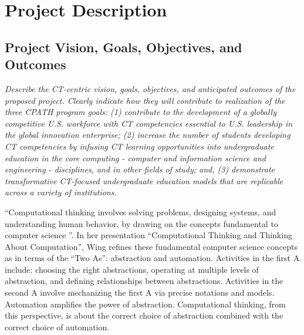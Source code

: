 
\section*{Project Description}
\renewcommand{\thepage} {C--\arabic{page}}

\subsection*{Project Vision, Goals, Objectives, and Outcomes}


{\em Describe the CT-centric vision, goals, objectives, and anticipated outcomes of the proposed project. Clearly indicate how they will contribute to realization of the three CPATH program goals: (1) contribute to the development of a globally competitive U.S. workforce with CT competencies essential to U.S. leadership in the global innovation enterprise; (2) increase the number of students developing CT competencies by infusing CT learning opportunities into undergraduate education in the core computing - computer and information science and engineering - disciplines, and in other fields of study; and, (3) demonstrate transformative CT-focused undergraduate education models that are replicable across a variety of institutions.
}

\bigskip

``Computational thinking involves solving problems, designing systems, and
understanding human behavior, by drawing on the concepts fundamental to
computer science \cite{Wing06}''.  In her presentation ``Computational
Thinking and Thinking About Computation'', Wing refines these fundamental
computer science concepts as in terms of the ``Two As'': abstraction and
automation.  Activities in the first A include: choosing the right
abstractions, operating at multiple levels of abstraction, and defining
relationships between abstractions.  Activities in the second A involve
mechanizing the first A via precise notations and models.  Automation
amplifies the power of abstraction.  Computational thinking, from this
perspective, is about the correct choice of abstraction combined with the
correct choice of automation.

